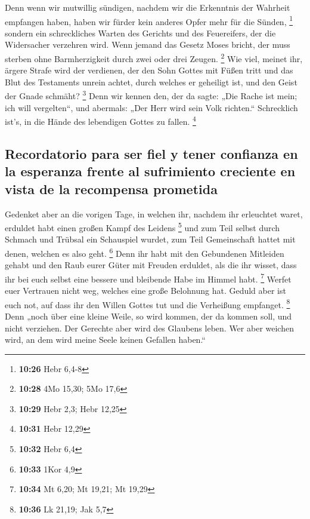  Denn wenn wir mutwillig sündigen, nachdem wir die
Erkenntnis der Wahrheit empfangen haben, haben wir fürder kein anderes
Opfer mehr für die Sünden, \footnote{\textbf{10:26} Hebr 6,4-8}
 sondern ein schreckliches Warten des Gerichts und des
Feuereifers, der die Widersacher verzehren wird.  Wenn
jemand das Gesetz Moses bricht, der muss sterben ohne Barmherzigkeit
durch zwei oder drei Zeugen. \footnote{\textbf{10:28} 4Mo 15,30; 5Mo
  17,6}  Wie viel, meinet ihr, ärgere Strafe wird der
verdienen, der den Sohn Gottes mit Füßen tritt und das Blut des
Testaments unrein achtet, durch welches er geheiligt ist, und den Geist
der Gnade schmäht? \footnote{\textbf{10:29} Hebr 2,3; Hebr 12,25}
 Denn wir kennen den, der da sagte: „Die Rache ist mein;
ich will vergelten``, und abermals: „Der Herr wird sein Volk richten.``
 Schrecklich ist's, in die Hände des lebendigen Gottes zu
fallen. \footnote{\textbf{10:31} Hebr 12,29}

\hypertarget{recordatorio-para-ser-fiel-y-tener-confianza-en-la-esperanza-frente-al-sufrimiento-creciente-en-vista-de-la-recompensa-prometida}{%
\subsection{Recordatorio para ser fiel y tener confianza en la esperanza
frente al sufrimiento creciente en vista de la recompensa
prometida}\label{recordatorio-para-ser-fiel-y-tener-confianza-en-la-esperanza-frente-al-sufrimiento-creciente-en-vista-de-la-recompensa-prometida}}

 Gedenket aber an die vorigen Tage, in welchen ihr,
nachdem ihr erleuchtet waret, erduldet habt einen großen Kampf des
Leidens \footnote{\textbf{10:32} Hebr 6,4}  und zum Teil
selbst durch Schmach und Trübsal ein Schauspiel wurdet, zum Teil
Gemeinschaft hattet mit denen, welchen es also geht. \footnote{\textbf{10:33}
  1Kor 4,9}  Denn ihr habt mit den Gebundenen Mitleiden
gehabt und den Raub eurer Güter mit Freuden erduldet, als die ihr
wisset, dass ihr bei euch selbst eine bessere und bleibende Habe im
Himmel habt. \footnote{\textbf{10:34} Mt 6,20; Mt 19,21; Mt 19,29}
 Werfet euer Vertrauen nicht weg, welches eine große
Belohnung hat.  Geduld aber ist euch not, auf dass ihr
den Willen Gottes tut und die Verheißung empfanget. \footnote{\textbf{10:36}
  Lk 21,19; Jak 5,7}  Denn „noch über eine kleine Weile,
so wird kommen, der da kommen soll, und nicht verziehen. 
Der Gerechte aber wird des Glaubens leben. Wer aber weichen wird, an dem
wird meine Seele keinen Gefallen haben.``

